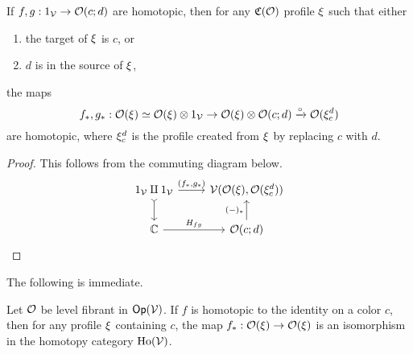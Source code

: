 \documentclass[a4paper,10pt
,draft
]{article}%
\renewcommand{\1}{\ensuremath{\mathbb{id}}}
\begin{document}
{\begin{lemma}
      If $f,g: 1_{\mathcal V} \to \mathcal{O}(c;d)$ are homotopic, then for any $\mathfrak C(\mathcal{O})$ profile $\xi$ such that either
      \begin{enumerate}[label = (\roman*)]
      \item the target of $\xi$ is $c$, or
      \item $d$ is in the source of $\xi$,
      \end{enumerate}
      the maps
      \begin{equation}
            f_{\**}, g_{\**}: \O(\ksi) \simeq \O(\ksi) \otimes 1_\V \to \O(\ksi) \otimes \O(c;d) \xrightarrow{\circ} \O(\ksi_c^d)
      \end{equation}
      are homotopic,
      where $\xi_c^d$ is the profile created from $\xi$ by replacing $c$ with $d$.
\end{lemma}
\begin{proof}
      This follows from the commuting diagram below.
      \begin{equation}
            \begin{tikzcd}
                  1_\V \amalg 1_\V \arrow[r, "{(f_{\**}, g_{\**})}"] \arrow[d, tail]
                  &
                  \V(\O(\ksi), \O(\ksi_c^d))
                  \\
                  \mathbb C \arrow[r, "H_{fg}"]
                  &
                  \O(c;d) \arrow[u, "{(-)_{\**}}"]
            \end{tikzcd}
      \end{equation}
\end{proof}

The following is immediate.
\begin{corollary}
      \label{HTPIC_ISO_COR}
      Let $\mathcal{O}$ be level fibrant in $\mathsf{Op}(\mathcal V)$. 
      If $f$ is homotopic to the identity on a color $c$, then for any profile $\xi$ containing $c$, the map
      $f_{\**}: \O(\ksi) \to \O(\ksi)$
     is an isomorphism in the homotopy category $\operatorname{Ho}(\mathcal V)$.
\end{corollary}
}
\end{document}

